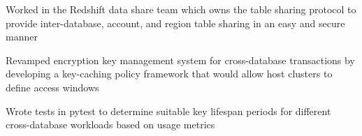 \begin{cvitemize}
\item Worked in the Redshift data share team which owns the table sharing protocol to provide inter-database, account, and region table sharing in an easy and secure manner
\item Revamped encryption key management system for cross-database transactions by developing a key-caching policy framework that would allow host clusters to define access windows
\item Wrote tests in pytest
 to determine suitable key lifespan periods for different cross-database workloads based on usage metrics
\end{cvitemize}